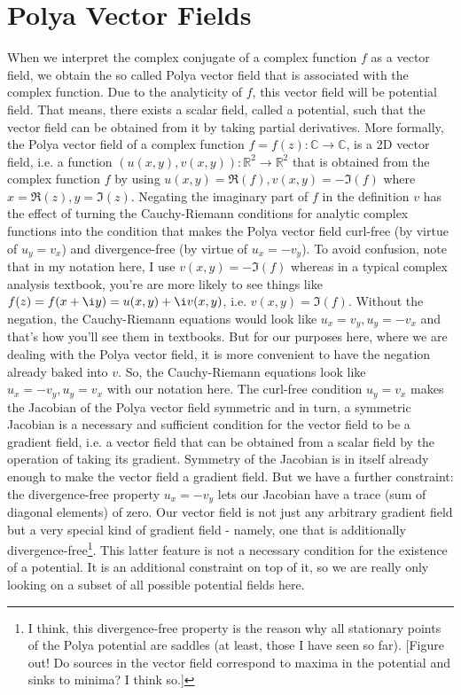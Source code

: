 \documentclass[12pt]{article}
\begin{document}
\section{Polya Vector Fields}
When we interpret the complex conjugate of a complex function $f$ as a vector field, we obtain the so called Polya vector field that is associated with the complex function. Due to the analyticity of $f$, this vector field will be potential field. That means, there exists a scalar field, called a potential, such that the vector field can be obtained from it by taking partial derivatives. More formally, the Polya vector field of a complex function $f = f(z): \mathbb{C} \rightarrow \mathbb{C}$, is a 2D vector field, i.e. a function $(u(x,y), v(x,y)): \mathbb{R}^2 \rightarrow \mathbb{R}^2$ that is obtained from the complex function $f$ by using $u(x,y) = \Re(f), v(x,y) = -\Im(f)$ where $x = \Re(z), y = \Im(z)$. Negating the imaginary part of $f$ in the definition $v$ has the effect of turning the Cauchy-Riemann conditions for analytic complex functions into the condition that makes the Polya vector field curl-free (by virtue of $u_y = v_x$) and divergence-free (by virtue of $u_x = - v_y$). To avoid confusion, note that in my notation here, I use $v(x,y) = -\Im(f)$ whereas in a typical complex analysis textbook, you're are more likely to see things like $f(z) = f(x + \i y) = u(x,y) + \i v(x,y)$, i.e. $v(x,y) = \Im(f)$. Without the negation, the Cauchy-Riemann equations would look like $u_x = v_y, u_y = -v_x$ and that's how you'll see them in textbooks. But for our purposes here, where we are dealing with the Polya vector field, it is more convenient to have the negation already baked into $v$. So, the Cauchy-Riemann equations look like $u_x = -v_y, u_y = v_x$ with our notation here. The curl-free condition $u_y = v_x$ makes the Jacobian of the Polya vector field symmetric and in turn, a symmetric Jacobian is a necessary and sufficient condition for the vector field to be a gradient field, i.e. a vector field that can be obtained from a scalar field by the operation of taking its gradient. Symmetry of the Jacobian is in itself already enough to make the vector field a gradient field. But we have a further constraint: the divergence-free property $u_x = -v_y$ lets our Jacobian have a trace (sum of diagonal elements) of zero. Our vector field is not just any arbitrary gradient field but a very special kind of gradient field - namely, one that is additionally divergence-free\footnote{I think, this divergence-free property is the reason why all stationary points of the Polya potential are saddles (at least, those I have seen so far). [Figure out! Do sources in the vector field correspond to maxima in the potential and sinks to minima? I think so.]}. This latter feature is not a necessary condition for the existence of a potential. It is an additional constraint on top of it, so we are really only looking on a subset of all possible potential fields here.
\end{document}
